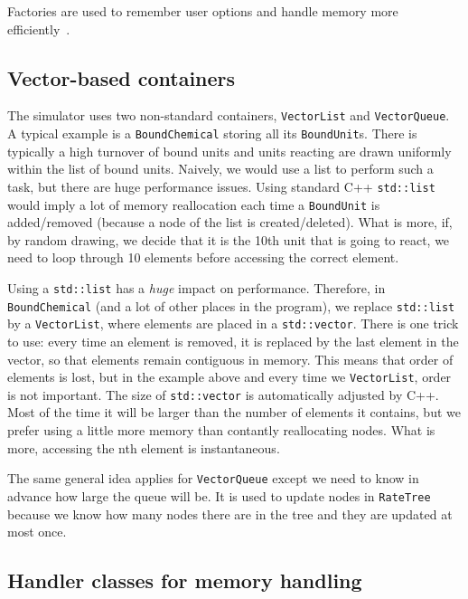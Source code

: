 Factories are used to remember user options and handle memory more efficiently~.

\subsection{Vector-based containers}

The simulator uses two non-standard containers, \texttt{VectorList} and \texttt{VectorQueue}. A typical example is a \texttt{BoundChemical} storing all its \texttt{BoundUnit}s. There is typically a high turnover of bound units and units reacting are drawn uniformly within the list of bound units. Naively, we would use a list to perform such a task, but there are huge performance issues. Using standard C++ \texttt{std::list} would imply a lot of memory reallocation each time a \texttt{BoundUnit} is added/removed (because a node of the list is created/deleted). What is more, if, by random drawing, we decide that it is the 10th unit that is going to react, we need to loop through 10 elements before accessing the correct element.

Using a \texttt{std::list} has a \emph{huge} impact on performance. Therefore, in \texttt{BoundChemical} (and a lot of other places in the program), we replace \texttt{std::list} by a \texttt{VectorList}, where elements are placed in a \texttt{std::vector}. There is one trick to use: every time an element is removed, it is replaced by the last element in the vector, so that elements remain contiguous in memory. This means that order of elements is lost, but in the example above and every time we \texttt{VectorList}, order is not important. The size of \texttt{std::vector} is automatically adjusted by C++. Most of the time it will be larger than the number of elements it contains, but we prefer using a little more memory than contantly reallocating nodes. What is more, accessing the nth element is instantaneous.

The same general idea applies for \texttt{VectorQueue} except we need to know in advance how large the queue will be. It is used to update nodes in \texttt{RateTree} because we know how many nodes there are in the tree and they are updated at most once.

\subsection{Handler classes for memory handling}

